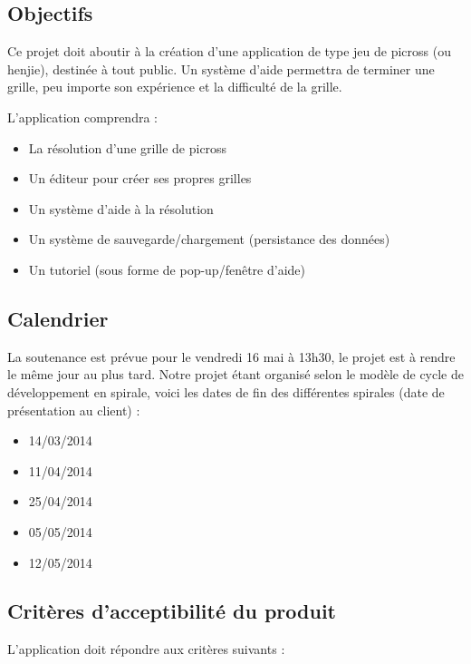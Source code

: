 \documentclass[a4paper, 12pt, twoside]{article}
\begin{document}
\subsection{Objectifs}

Ce projet doit aboutir à la création d'une application de type jeu de picross (ou henjie), destinée à tout public. Un système d'aide permettra de terminer une grille, peu importe son expérience et la difficulté de la grille.\newline

L'application comprendra :\newline

\begin{itemize}\setlength{\itemsep}{3mm}
 \item La résolution d'une grille de picross
 \item Un éditeur pour créer ses propres grilles
 \item Un système d'aide à la résolution
 \item Un système de sauvegarde/chargement (persistance des données)
 \item Un tutoriel (sous forme de pop-up/fenêtre d'aide)
\end{itemize}

\subsection{Calendrier}

La soutenance est prévue pour le vendredi 16 mai à 13h30, le projet est à rendre le même jour au plus tard.
Notre projet étant organisé selon le modèle de cycle de développement en spirale, voici les dates de fin des différentes spirales (date de présentation au client) :\newline

\begin{itemize}\setlength{\itemsep}{3mm}
 \item 14/03/2014
 \item 11/04/2014
 \item 25/04/2014
 \item 05/05/2014
 \item 12/05/2014
\end{itemize}

\subsection{Critères d'acceptibilité du produit}

L’application doit répondre aux critères suivants :\newline
\end{document}
